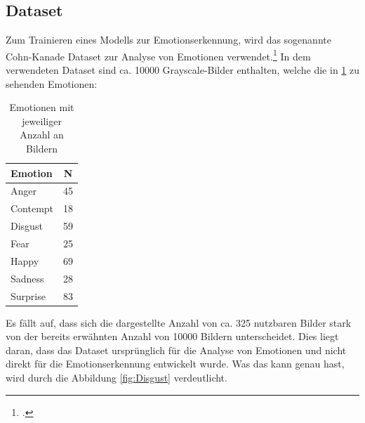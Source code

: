 \documentclass[12pt, a4paper]{report}
\begin{document}
\subsection{Dataset}
Zum Trainieren eines Modells zur Emotionserkennung, wird das sogenannte Cohn-Kanade Dataset zur Analyse von Emotionen verwendet.\footcite[Vgl.][]{CK} In dem verwendeten Dataset sind ca. 10000 Grayscale-Bilder enthalten, welche die in \ref{tab:ckemotions} zu sehenden Emotionen:
\begin{table}[h]
\centering
\begin{tabular}[t]{l|c}
Emotion & N \\
\hline
Anger & 45 \\
Contempt & 18 \\
Disgust & 59 \\
Fear & 25 \\
Happy & 69 \\
Sadness & 28 \\
Surprise & 83 \\
\hline
\end{tabular}
\caption{Emotionen mit jeweiliger Anzahl an Bildern}
\label{tab:ckemotions}
\end{table}
Es fällt auf, dass sich die dargestellte Anzahl von ca. 325 nutzbaren Bilder stark von der bereits erwähnten Anzahl von 10000 Bildern unterscheidet. Dies liegt daran, dass das Dataset ursprünglich für die Analyse von Emotionen und nicht direkt für die Emotionserkennung entwickelt wurde. Was das kann genau hast, wird durch die Abbildung \ref{fig:Disgust} verdeutlicht.
\end{document}
